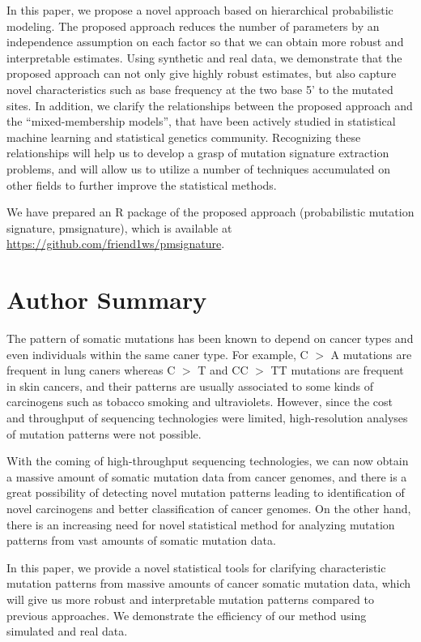 In this paper, we propose a novel approach based on hierarchical probabilistic modeling.
The proposed approach reduces the number of parameters by an independence assumption on each factor 
so that we can obtain more robust and interpretable estimates.
Using synthetic and real data, we demonstrate that the proposed approach can not only give highly robust estimates,
but also capture novel characteristics such as base frequency at the two base 5' to the mutated sites.
In addition, we clarify the relationships between the proposed approach and the ``mixed-membership models'', 
that have been actively studied in statistical machine learning and statistical genetics community.
Recognizing these relationships will help us to develop a grasp of mutation signature extraction problems,
and will allow us to utilize a number of techniques accumulated on other fields to further improve the statistical methods.

We have prepared an R package of the proposed approach (probabilistic mutation signature, pmsignature),
which is available at \url{https://github.com/friend1ws/pmsignature}.


\section*{Author Summary}


The pattern of somatic mutations has been known to depend on cancer types and even individuals within the same caner type.
For example, C $>$ A mutations are frequent in lung caners
whereas C $>$ T and CC $>$ TT mutations are frequent in skin cancers,
and their patterns are usually associated to some kinds of carcinogens such as tobacco smoking and ultraviolets.
However, since the cost and throughput of sequencing technologies were limited, 
high-resolution analyses of mutation patterns were not possible.

With the coming of high-throughput sequencing technologies, we can now obtain a massive amount of somatic mutation data from cancer genomes,
and there is a great possibility of detecting novel mutation patterns leading to identification of novel carcinogens
and better classification of cancer genomes.
On the other hand, there is an increasing need for novel statistical method for analyzing mutation patterns
from vast amounts of somatic mutation data.

In this paper, we provide a novel statistical tools for clarifying characteristic mutation patterns
from massive amounts of cancer somatic mutation data, 
which will give us more robust and interpretable mutation patterns compared to previous approaches.
We demonstrate the efficiency of our method using simulated and real data.




